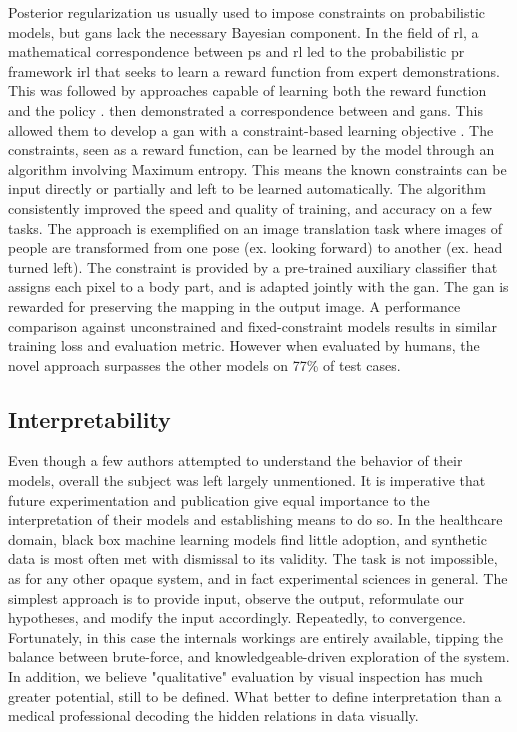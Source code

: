 Posterior regularization us usually used to impose constraints on probabilistic models, but \glspl{gan} lack the necessary Bayesian component. In the field of \gls{rl}, a mathematical correspondence between \gls{ps} and \gls{rl} led to the probabilistic \gls{pr} framework \gls{irl} that seeks to learn a reward function from expert demonstrations. This was followed by approaches capable of learning both the reward function and the policy \cite{finn2016guided,fu2018learning}. \citeauthor{Hu2018} then demonstrated a correspondence between  and \glspl{gan}. This allowed them to develop a \gls{gan} with a constraint-based learning objective \cite{Hu2018}. The constraints, seen as a reward function, can be learned by the model through an algorithm involving Maximum entropy. This means the known constraints can be input directly or partially and left to be learned automatically. The algorithm consistently improved the speed and quality of training, and accuracy on a few tasks. The approach is exemplified on an image translation task where images of people are transformed from one pose (ex. looking forward) to another (ex. head turned left). The constraint is provided by a pre-trained auxiliary classifier that assigns each pixel to a body part, and is adapted jointly with the \gls{gan}. The \gls{gan} is rewarded for preserving the mapping in the output image. A performance comparison against unconstrained and fixed-constraint models results in similar training loss and evaluation metric. However when evaluated by humans, the novel approach surpasses the other models on 77\% of test cases. \par

\subsection{Interpretability\label{sec:latent-space}}
Even though a few authors attempted to understand the behavior of their models, overall the subject was left largely unmentioned. It is imperative that future experimentation and publication give equal importance to the interpretation of their models and establishing means to do so. In the healthcare domain, black box machine learning models find little adoption, and synthetic data is most often met with dismissal to its validity. The task is not impossible, as for any other opaque system, and in fact experimental sciences in general. The simplest approach is to  provide input, observe the output, reformulate our hypotheses, and modify the input accordingly. Repeatedly, to convergence. Fortunately, in this case the internals workings are entirely available, tipping the balance between brute-force, and knowledgeable-driven exploration of the system. In addition, we believe "qualitative" evaluation by visual inspection has much greater potential, still to be defined. What better to define interpretation than a medical professional decoding the hidden relations in data visually. \par

